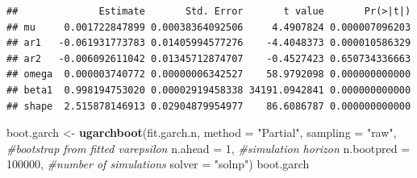 \documentclass[
]{book}
\newenvironment{Shaded}{\begin{snugshade}}{\end{snugshade}}
\newcommand{\AttributeTok}[1]{\textcolor[rgb]{0.13,0.29,0.53}{#1}}
\newcommand{\CommentTok}[1]{\textcolor[rgb]{0.56,0.35,0.01}{\textit{#1}}}
\newcommand{\DecValTok}[1]{\textcolor[rgb]{0.00,0.00,0.81}{#1}}
\newcommand{\FunctionTok}[1]{\textcolor[rgb]{0.13,0.29,0.53}{\textbf{#1}}}
\newcommand{\NormalTok}[1]{#1}
\newcommand{\OtherTok}[1]{\textcolor[rgb]{0.56,0.35,0.01}{#1}}
\newcommand{\SpecialCharTok}[1]{\textcolor[rgb]{0.81,0.36,0.00}{\textbf{#1}}}
\newcommand{\StringTok}[1]{\textcolor[rgb]{0.31,0.60,0.02}{#1}}
\begin{document}
\begin{Shaded}
\end{Shaded}

\begin{verbatim}
##              Estimate       Std. Error       t value       Pr(>|t|)
## mu     0.001722847899 0.00038364092506     4.4907824 0.000007096203
## ar1   -0.061931773783 0.01405994577276    -4.4048373 0.000010586329
## ar2   -0.006092611042 0.01345712874707    -0.4527423 0.650734336663
## omega  0.000003740772 0.00000006342527    58.9792098 0.000000000000
## beta1  0.998194753020 0.00002919458338 34191.0942841 0.000000000000
## shape  2.515878146913 0.02904879954977    86.6086787 0.000000000000
\end{verbatim}

\begin{Shaded}
\begin{Highlighting}[]
\NormalTok{boot.garch }\OtherTok{\textless{}{-}} \FunctionTok{ugarchboot}\NormalTok{(fit.garch.n,}
                         \AttributeTok{method =} \StringTok{"Partial"}\NormalTok{,}
                         \AttributeTok{sampling =} \StringTok{"raw"}\NormalTok{,  }\CommentTok{\#bootstrap from fitted varepsilon}
                         \AttributeTok{n.ahead =} \DecValTok{1}\NormalTok{,          }\CommentTok{\#simulation horizon}
                         \AttributeTok{n.bootpred =} \DecValTok{100000}\NormalTok{, }\CommentTok{\#number of simulations }
                         \AttributeTok{solver =} \StringTok{"solnp"}\NormalTok{)}
\NormalTok{boot.garch}
\end{Highlighting}
\end{Shaded}
\end{document}
